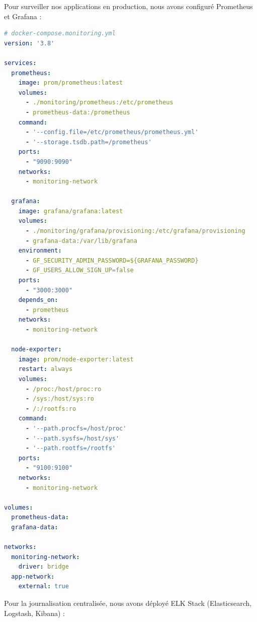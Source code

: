 Pour surveiller nos applications en production, nous avons configuré Prometheus et Grafana :

\begin{lstlisting}[style=codestyle, language=YAML]
# docker-compose.monitoring.yml
version: '3.8'

services:
  prometheus:
    image: prom/prometheus:latest
    volumes:
      - ./monitoring/prometheus:/etc/prometheus
      - prometheus-data:/prometheus
    command:
      - '--config.file=/etc/prometheus/prometheus.yml'
      - '--storage.tsdb.path=/prometheus'
    ports:
      - "9090:9090"
    networks:
      - monitoring-network

  grafana:
    image: grafana/grafana:latest
    volumes:
      - ./monitoring/grafana/provisioning:/etc/grafana/provisioning
      - grafana-data:/var/lib/grafana
    environment:
      - GF_SECURITY_ADMIN_PASSWORD=${GRAFANA_PASSWORD}
      - GF_USERS_ALLOW_SIGN_UP=false
    ports:
      - "3000:3000"
    depends_on:
      - prometheus
    networks:
      - monitoring-network

  node-exporter:
    image: prom/node-exporter:latest
    restart: always
    volumes:
      - /proc:/host/proc:ro
      - /sys:/host/sys:ro
      - /:/rootfs:ro
    command:
      - '--path.procfs=/host/proc'
      - '--path.sysfs=/host/sys'
      - '--path.rootfs=/rootfs'
    ports:
      - "9100:9100"
    networks:
      - monitoring-network

volumes:
  prometheus-data:
  grafana-data:

networks:
  monitoring-network:
    driver: bridge
  app-network:
    external: true
\end{lstlisting}

Pour la journalisation centralisée, nous avons déployé ELK Stack (Elasticsearch, Logstash, Kibana) :


